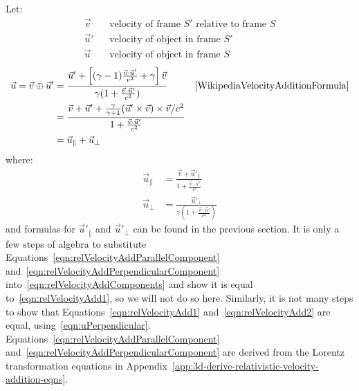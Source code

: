 \documentclass[a4paper]{article}
\theoremstyle{plain}
\theoremstyle{definition}
\newcommand{\vect}[1]{\vec{#1}}
\begin{document}
Let:
\begin{align*}
  \vect{v} & & \text{velocity of frame $S'$ relative to frame $S$} \\
  \vect{u}' & & \text{velocity of object in frame $S'$} \\
  \vect{u} & & \text{velocity of object in frame $S$}
\end{align*}
\begin{align}
\vect{u} = \vect{v} \oplus \vect{u}'
  & = \frac{ \vect{u}' + \left[ (\gamma-1) \frac{\vect{v} \cdot \vect{u}'}{v^2} + \gamma \right] \vect{v} }
           { \gamma (1 + \frac{\vect{v} \cdot \vect{u}'}{c^2}) } & & \text{\cite{WikipediaVelocityAdditionFormula}} \label{eqn:relVelocityAdd1} \\
  & = \frac{ \vect{v} + \vect{u}' + \frac{\gamma}{\gamma+1} (\vect{u}' \times \vect{v}) \times \vect{v} / c^2 }
           { 1 + \frac{\vect{v} \cdot \vect{u}'}{c^2} } \label{eqn:relVelocityAdd2} \\
  & = \vect{u}_{\parallel} + \vect{u}_{\perp} \label{eqn:relVelocityAddComponents}
\end{align}
where:
\begin{align}
\vect{u}_{\parallel}
  & = \frac{ \vect{v} + \vect{u}'_{\parallel} }{1 + \frac{ \vect{v} \cdot \vect{u}'}{c^2} } \label{eqn:relVelocityAddParallelComponent} \\
\vect{u}_{\perp}
  & = \frac{ \vect{u}'_{\perp} }{\gamma (1 + \frac{ \vect{v} \cdot \vect{u}'}{c^2} )} \label{eqn:relVelocityAddPerpendicularComponent}
\end{align}
and formulas for $\vect{u}'_{\parallel}$ and $\vect{u}'_{\perp}$ can
be found in the previous section.  It is only a few steps of algebra
to substitute Equations~\eqref{eqn:relVelocityAddParallelComponent}
and~\eqref{eqn:relVelocityAddPerpendicularComponent}
into~\eqref{eqn:relVelocityAddComponents} and show it is equal
to~\eqref{eqn:relVelocityAdd1}, so we will not do so here.
Similarly, it is not many steps to show that
Equations~\eqref{eqn:relVelocityAdd1} and~\eqref{eqn:relVelocityAdd2}
are equal, using~\eqref{eqn:uPerpendicular}.
Equations~\eqref{eqn:relVelocityAddParallelComponent}
and~\eqref{eqn:relVelocityAddPerpendicularComponent}
are derived from the Lorentz transformation equations
in Appendix~\ref{app:3d-derive-relativistic-velocity-addition-eqns}.
\end{document}
